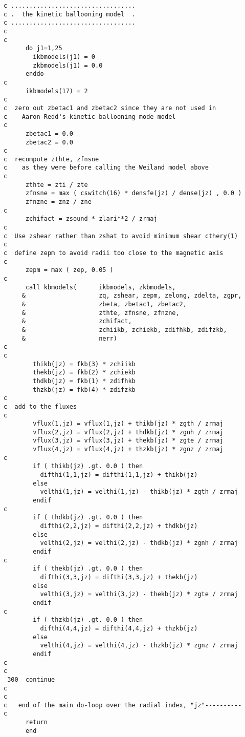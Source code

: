 \begin{verbatim}
c ..................................
c .  the kinetic ballooning model  .
c ..................................
c
c
      do j1=1,25
        ikbmodels(j1) = 0
        zkbmodels(j1) = 0.0
      enddo
c
      ikbmodels(17) = 2
c
c  zero out zbetac1 and zbetac2 since they are not used in
c    Aaron Redd's kinetic ballooning mode model
c
      zbetac1 = 0.0
      zbetac2 = 0.0
c
c  recompute zthte, zfnsne
c    as they were before calling the Weiland model above
c
      zthte = zti / zte
      zfnsne = max ( cswitch(16) * densfe(jz) / dense(jz) , 0.0 )
      zfnzne = znz / zne
c
      zchifact = zsound * zlari**2 / zrmaj
c
c  Use zshear rather than zshat to avoid minimum shear cthery(1)
c
c  define zepm to avoid radii too close to the magnetic axis
c
      zepm = max ( zep, 0.05 )
c
      call kbmodels(      ikbmodels, zkbmodels,
     &                    zq, zshear, zepm, zelong, zdelta, zgpr,
     &                    zbeta, zbetac1, zbetac2,
     &                    zthte, zfnsne, zfnzne,
     &                    zchifact,
     &                    zchiikb, zchiekb, zdifhkb, zdifzkb,
     &                    nerr)
c
c
        thikb(jz) = fkb(3) * zchiikb
        thekb(jz) = fkb(2) * zchiekb
        thdkb(jz) = fkb(1) * zdifhkb
        thzkb(jz) = fkb(4) * zdifzkb
c
c  add to the fluxes
c
        vflux(1,jz) = vflux(1,jz) + thikb(jz) * zgth / zrmaj
        vflux(2,jz) = vflux(2,jz) + thdkb(jz) * zgnh / zrmaj
        vflux(3,jz) = vflux(3,jz) + thekb(jz) * zgte / zrmaj
        vflux(4,jz) = vflux(4,jz) + thzkb(jz) * zgnz / zrmaj
c
        if ( thikb(jz) .gt. 0.0 ) then
          difthi(1,1,jz) = difthi(1,1,jz) + thikb(jz)
        else
          velthi(1,jz) = velthi(1,jz) - thikb(jz) * zgth / zrmaj
        endif
c
        if ( thdkb(jz) .gt. 0.0 ) then
          difthi(2,2,jz) = difthi(2,2,jz) + thdkb(jz)
        else
          velthi(2,jz) = velthi(2,jz) - thdkb(jz) * zgnh / zrmaj
        endif
c
        if ( thekb(jz) .gt. 0.0 ) then
          difthi(3,3,jz) = difthi(3,3,jz) + thekb(jz)
        else
          velthi(3,jz) = velthi(3,jz) - thekb(jz) * zgte / zrmaj
        endif
c
        if ( thzkb(jz) .gt. 0.0 ) then
          difthi(4,4,jz) = difthi(4,4,jz) + thzkb(jz)
        else
          velthi(4,jz) = velthi(4,jz) - thzkb(jz) * zgnz / zrmaj
        endif
c
c
 300  continue
c
c
c   end of the main do-loop over the radial index, "jz"----------
c
      return
      end
\end{verbatim}
 

